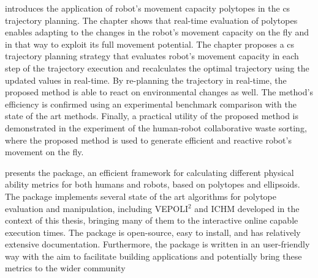  introduces the application of robot's movement capacity polytopes in the \gls{cs} trajectory planning.
The chapter shows that real-time evaluation of polytopes enables adapting to the changes in the robot's movement capacity on the fly and in that way to exploit its full movement potential.
The chapter proposes a \gls{cs} trajectory planning strategy that evaluates robot's movement capacity in each step of the trajectory execution and recalculates the optimal trajectory using the updated values in real-time.
By re-planning the trajectory in real-time, the proposed method is able to react on environmental changes as well.
The method's efficiency is confirmed using an experimental benchmark comparison with the state of the art methods. 
Finally, a practical utility of the proposed method is demonstrated in the experiment of the human-robot collaborative waste sorting, where the proposed method is used to generate efficient and reactive robot's movement on the fly.


 presents the  package, an efficient framework for calculating different physical ability metrics for both humans and robots, based on polytopes and ellipsoids.
The package implements several state of the art algorithms for polytope evaluation and manipulation, including VEPOLI$^2$ and ICHM developed in the context of this thesis, bringing many of them to the interactive online capable execution times.
The package is open-source, easy to install, and has relatively extensive documentation. Furthermore, the package is written in an user-friendly way with the aim to facilitate building applications and potentially bring these metrics to the wider community


